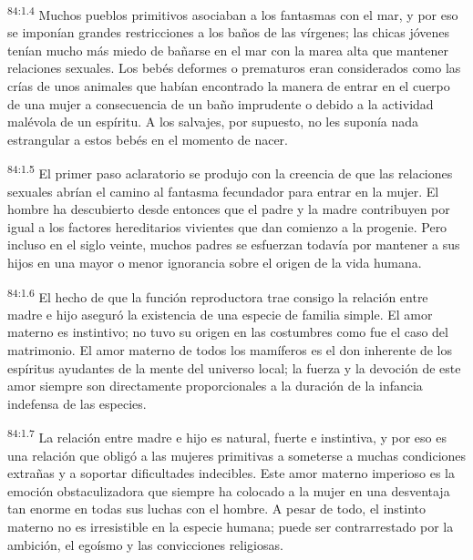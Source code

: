 \documentclass[twoside, 11pt]{book}
\begin{document}
\par
\textsuperscript{84:1.4} Muchos pueblos primitivos asociaban a los fantasmas con el mar, y por eso se imponían grandes restricciones a los baños de las vírgenes; las chicas jóvenes tenían mucho más miedo de bañarse en el mar con la marea alta que mantener relaciones sexuales. Los bebés deformes o prematuros eran considerados como las crías de unos animales que habían encontrado la manera de entrar en el cuerpo de una mujer a consecuencia de un baño imprudente o debido a la actividad malévola de un espíritu. A los salvajes, por supuesto, no les suponía nada estrangular a estos bebés en el momento de nacer.

\par
\textsuperscript{84:1.5} El primer paso aclaratorio se produjo con la creencia de que las relaciones sexuales abrían el camino al fantasma fecundador para entrar en la mujer. El hombre ha descubierto desde entonces que el padre y la madre contribuyen por igual a los factores hereditarios vivientes que dan comienzo a la progenie. Pero incluso en el siglo veinte, muchos padres se esfuerzan todavía por mantener a sus hijos en una mayor o menor ignorancia sobre el origen de la vida humana.

\par
\textsuperscript{84:1.6} El hecho de que la función reproductora trae consigo la relación entre madre e hijo aseguró la existencia de una especie de familia simple. El amor materno es instintivo; no tuvo su origen en las costumbres como fue el caso del matrimonio. El amor materno de todos los mamíferos es el don inherente de los espíritus ayudantes de la mente del universo local; la fuerza y la devoción de este amor siempre son directamente proporcionales a la duración de la infancia indefensa de las especies.

\par
\textsuperscript{84:1.7} La relación entre madre e hijo es natural, fuerte e instintiva, y por eso es una relación que obligó a las mujeres primitivas a someterse a muchas condiciones extrañas y a soportar dificultades indecibles. Este amor materno imperioso es la emoción obstaculizadora que siempre ha colocado a la mujer en una desventaja tan enorme en todas sus luchas con el hombre. A pesar de todo, el instinto materno no es irresistible en la especie humana; puede ser contrarrestado por la ambición, el egoísmo y las convicciones religiosas.
\end{document}
